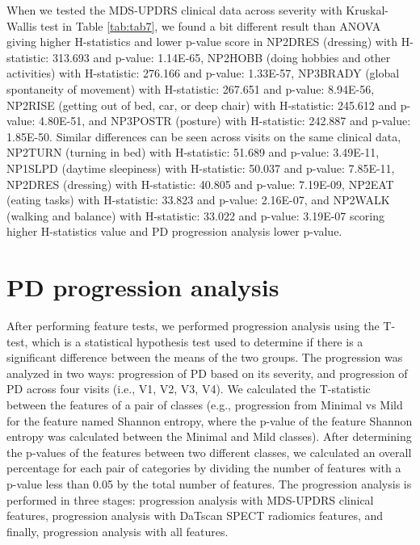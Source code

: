 \documentclass{article}
\begin{document}
When we tested the MDS-UPDRS clinical data across severity with Kruskal-Wallis test in Table \ref{tab:tab7}, we found a bit different result than ANOVA giving higher H-statistics and lower p-value score in NP2DRES (dressing) with H-statistic: 313.693 and p-value: 1.14E-65, NP2HOBB (doing hobbies and other activities) with H-statistic: 276.166 and p-value: 1.33E-57, NP3BRADY (global spontaneity of movement) with H-statistic: 267.651 and p-value: 8.94E-56, NP2RISE (getting out of bed, car, or deep chair) with H-statistic: 245.612 and p-value: 4.80E-51, and NP3POSTR (posture) with H-statistic: 242.887 and p-value: 1.85E-50. Similar differences can be seen across visits on the same clinical data, NP2TURN (turning in bed) with H-statistic: 51.689 and p-value: 3.49E-11, NP1SLPD (daytime sleepiness) with H-statistic: 50.037 and p-value: 7.85E-11, NP2DRES (dressing) with H-statistic: 40.805 and p-value: 7.19E-09, NP2EAT (eating tasks) with H-statistic: 33.823 and p-value: 2.16E-07, and NP2WALK (walking and balance) with H-statistic: 33.022 and p-value: 3.19E-07 scoring higher H-statistics value and PD progression analysis lower p-value.

\section{PD progression analysis}
\label{PD Progression}

After performing feature tests, we performed progression analysis using the T-test, which is a statistical hypothesis test used to determine if there is a significant difference between the means of the two groups. The progression was analyzed in two ways: progression of PD based on its severity, and progression of PD across four visits (i.e., V1, V2, V3, V4). We calculated the T-statistic between the features of a pair of classes (e.g., progression from Minimal vs Mild for the feature named Shannon entropy, where the p-value of the feature Shannon entropy was calculated between the Minimal and Mild classes). After determining the p-values of the features between two different classes, we calculated an overall percentage for each pair of categories by dividing the number of features with a p-value less than 0.05 by the total number of features. The progression analysis is performed in three stages: progression analysis with MDS-UPDRS clinical features, progression analysis with DaTscan SPECT radiomics features, and finally, progression analysis with all features.
\end{document}
